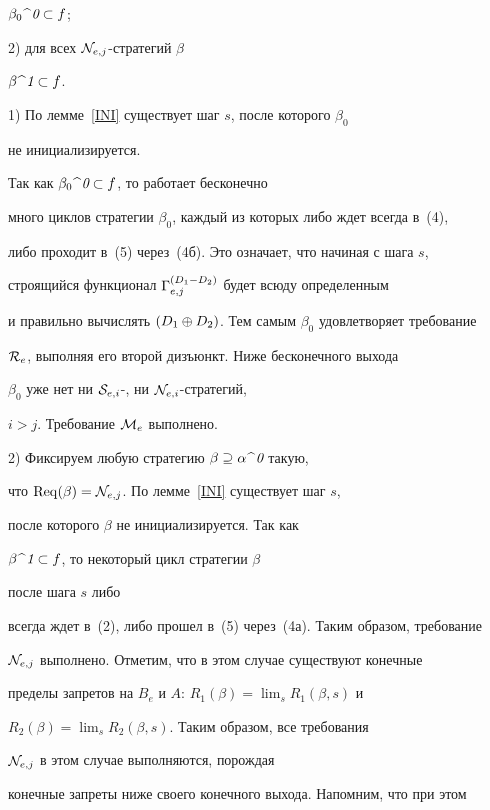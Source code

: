 \begin{pf}
$\beta_0\,\widehat{\ }\,\text{\it 0}\subset f$;


2) для всех ${\cal N}_{e,j}$-стратегий $\beta$\;


$\beta\,\widehat{\ }\,\text{\it 1}\subset f$.





1) По лемме~\ref{INI} существует шаг $s$, после которого $\beta_0$


не инициализируется.


Так как $\beta_0\,\widehat{\ }\,\text{\it 0}\subset f$, то работает бесконечно


много циклов стратегии $\beta_0$, каждый из которых либо ждет всегда в~(4),


либо проходит в~(5) через~(4б). Это означает, что начиная с шага $s$,


строящийся функционал $\Gamma_{e,j}^{\draz}$ будет всюду определенным


и правильно вычислять $(D_1\oplus D_2)$. Тем самым $\beta_0$ удовлетворяет требование


${\cal R}_e$, выполняя его второй дизъюнкт. Ниже бесконечного выхода


$\beta_0$ уже нет ни ${\cal S}_{e,i}$-, ни ${\cal N}_{e,i}$-стратегий,


$i>j$. Требование ${\cal M}_e$ выполнено.





2) Фиксируем любую стратегию $\beta\supseteq\alpha\,\widehat{\ }\,\text{\it 0}$ такую,


что $\operatorname{Req}(\beta)={\cal N}_{e,j}$. По лемме~\ref{INI} существует шаг $s$,


после которого $\beta$ не инициализируется. Так как


$\beta\,\widehat{\ }\,\text{\it 1}\subset f$, то некоторый цикл стратегии $\beta$


после шага $s$ либо


всегда ждет в~(2), либо прошел в~(5) через~(4а). Таким образом, требование


${\cal N}_{e,j}$ выполнено. Отметим, что в этом случае существуют конечные


пределы запретов на $B_e$ и $A$: $R_1(\beta)=\lim_s R_1(\beta,s)$ и


$R_2(\beta)=\lim_s R_2(\beta,s)$. Таким образом, все требования


${\cal N}_{e,j}$ в этом случае выполняются, порождая


конечные запреты ниже своего конечного выхода. Напомним, что при этом



\end{pf}
